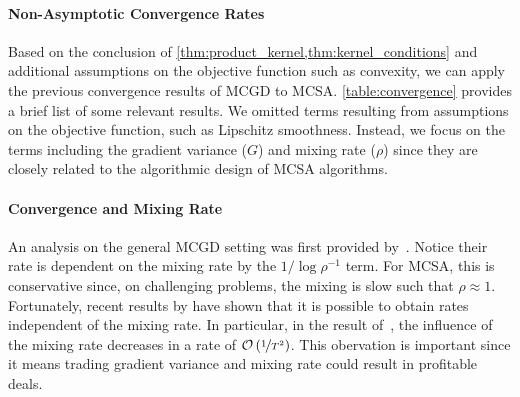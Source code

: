 \vspace{-0.1in}
\paragraph{Non-Asymptotic Convergence Rates}
Based on the conclusion of \cref{thm:product_kernel,thm:kernel_conditions} and additional assumptions on the objective function such as convexity, we can apply the previous convergence results of MCGD to MCSA.
\cref{table:convergence} provides a brief list of some relevant results.
We omitted terms resulting from assumptions on the objective function, such as Lipschitz smoothness.
Instead, we focus on the terms including the gradient variance (\(G\)) and mixing rate (\(\rho\)) since they are closely related to the algorithmic design of MCSA algorithms.

\vspace{-0.1in}
\paragraph{Convergence and Mixing Rate}
An analysis on the general MCGD setting was first provided by~\citet{duchi_ergodic_2012}.
Notice their rate is dependent on the mixing rate by the \(1 / \log \rho^{-1}\) term.
For MCSA, this is conservative since, on challenging problems, the mixing is slow such that \(\rho \approx 1\).
Fortunately, recent results by \citet{doan_convergence_2020,doan_finitetime_2020} have shown that it is possible to obtain rates independent of the mixing rate.
In particular, in the result of~\citet{doan_finitetime_2020}, the influence of the mixing rate decreases in a rate of \(\mathcal{O}\left(\nicefrac{1}{T^2}\right)\).
This obervation is important since it means trading gradient variance and mixing rate could result in profitable deals.

